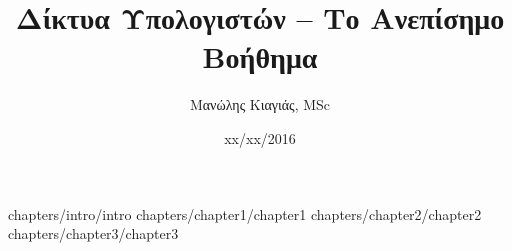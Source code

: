 \documentclass[a4paper,twoside,12pt]{book}
\author{Μανώλης Κιαγιάς, MSc}
\title{Δίκτυα Υπολογιστών -- Το Ανεπίσημο Βοήθημα}
\date{xx/xx/2016}
\begin{document}
\frontmatter
 {chapters/intro/intro}
\mainmatter
 {chapters/chapter1/chapter1}
 {chapters/chapter2/chapter2}
 {chapters/chapter3/chapter3}
\end{document}
